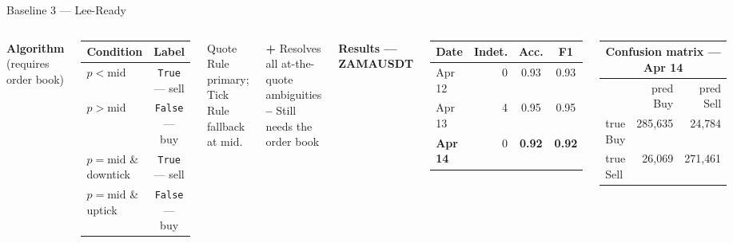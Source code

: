 \documentclass[aspectratio=169,10pt]{beamer}
\newcommand{\code}[1]{\texttt{\small #1}}
\begin{document}
\begin{frame}{Baseline 3 — Lee-Ready}
  \begin{columns}[T]
    \textbf{Algorithm} \quad(requires order book)

    \medskip
    \begin{center}
    \begin{tabular}{lc}
      \toprule
      Condition & Label \\
      \midrule
      $p < \text{mid}$                        & \code{True}  — sell \\
      $p > \text{mid}$                        & \code{False} — buy  \\
      $p = \text{mid}$ \& downtick            & \code{True}  — sell \\
      $p = \text{mid}$ \& uptick              & \code{False} — buy  \\
      \bottomrule
    \end{tabular}
    \end{center}

    \medskip
    Quote Rule primary; Tick Rule fallback at mid.

    \medskip
    \textcolor{okgreen}{\textbf{+}} Resolves all at-the-quote ambiguities\\
    \textcolor{badred}{\textbf{--}} Still needs the order book

    \textbf{Results — ZAMAUSDT}

    \medskip
    \begin{center}
    \begin{tabular}{lrcc}
      \toprule
      Date & Indet. & Acc. & F1 \\
      \midrule
      Apr 12 & 0 & 0.93 & 0.93 \\
      Apr 13 & 4 & 0.95 & 0.95 \\
      \textbf{Apr 14} & 0 & \textbf{0.92} & \textbf{0.92} \\
      \bottomrule
    \end{tabular}
    \end{center}

    \medskip
    \begin{center}
    \begin{tabular}{lrr}
      \multicolumn{3}{c}{\small Confusion matrix — Apr 14}\\
      \toprule
       & pred Buy & pred Sell \\
      \midrule
      true Buy  & 285{,}635 & 24{,}784 \\
      true Sell & 26{,}069  & 271{,}461 \\
      \bottomrule
    \end{tabular}
    \end{center}
  \end{columns}
\end{frame}
\end{document}
